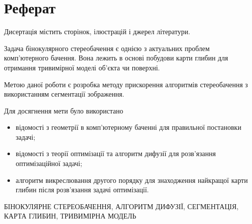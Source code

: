 \chapter*{Реферат}

Дисертація містить \pageref{LastPage} сторінок,
 ілюстрацій і
 джерел літератури.

Задача бінокулярного стереобачення є
однією з актуальних проблем комп'ютерного бачення.
Вона лежить в основі побудови карти глибин
для отримання тривимірної моделі об'єкта чи поверхні.

Метою даної роботи є розробка методу прискорення алгоритмів стереобачення
з використанням сегментації зображення.

Для досягнення мети було використано
\begin{itemize}
  \item відомості з геометрії в комп'ютерному баченні
        для правильної постановки задачі;
  \item відомості з теорії оптимізації та
        алгоритм дифузії для розв'язання оптимізаційної задачі;
  \item алгоритм викреслювання другого порядку для знаходження
        найкращої карти глибин після розв'язання задачі оптимізації.
\end{itemize}

\MakeUppercase{бінокулярне стереобачення,
               алгоритм дифузії,
               сегментація,
               карта глибин,
               тривимірна модель}
